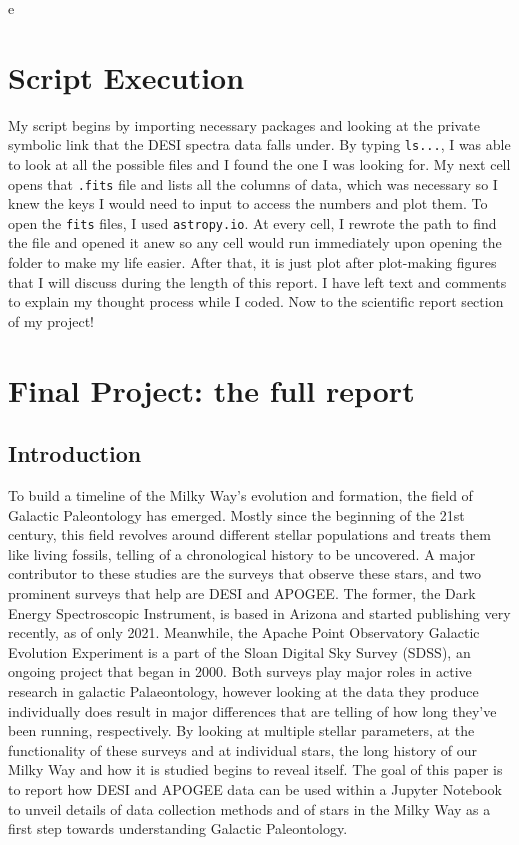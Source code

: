 e\documentclass{article}
\begin{document}
\section*{Script Execution}
My script begins by importing necessary packages and looking at the private symbolic link that the DESI spectra data falls under. By typing \texttt{ls...}, I was able to look at all the possible files and I found the one I was looking for. My next cell opens that \texttt{.fits} file and lists all the columns of data, which was necessary so I knew the keys I would need to input to access the numbers and plot them. To open the \texttt{fits} files, I used \texttt{astropy.io}. At every cell, I rewrote the path to find the file and opened it anew so any cell would run immediately upon opening the folder to make my life easier. After that, it is just plot after plot-making figures that I will discuss during the length of this report. I have left text and comments to explain my thought process while I coded. Now to the scientific report section of my project!\\

\section*{Final Project: the full report}
\subsection*{Introduction}
\indent To build a timeline of the Milky Way’s evolution and formation, the field of Galactic Paleontology has emerged. Mostly since the beginning of the 21st century, this field revolves around different stellar populations and treats them like living fossils, telling of a chronological history to be uncovered. A major contributor to these studies are the surveys that observe these stars, and two prominent surveys that help are DESI and APOGEE. The former, the Dark Energy Spectroscopic Instrument, is based in Arizona and started publishing very recently, as of only 2021. Meanwhile, the Apache Point Observatory Galactic Evolution Experiment is a part of the Sloan Digital Sky Survey (SDSS), an ongoing project that began in 2000. Both surveys play major roles in active research in galactic Palaeontology, however looking at the data they produce individually does result in major differences that are telling of how long they’ve been running, respectively. By looking at multiple stellar parameters, at the functionality of these surveys and at individual stars, the long history of our Milky Way and how it is studied begins to reveal itself. The goal of this paper is to report how DESI and APOGEE data can be used within a Jupyter Notebook to unveil details of data collection methods and of stars in the Milky Way as a first step towards understanding Galactic Paleontology. 
\end{document}
